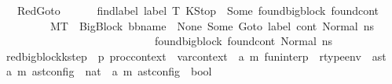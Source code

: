 \begin{isabellebody}
\isanewline
\ \ {\isacharbar}{\kern0pt}\ RedGoto{\isacharcolon}{\kern0pt}\ \isanewline
\ \ \ \ {\isachardoublequoteopen}{\isasymlbrakk}\ {\isacharparenleft}{\kern0pt}find{\isacharunderscore}{\kern0pt}label\ label\ T\ KStop{\isacharparenright}{\kern0pt}\ {\isacharequal}{\kern0pt}\ Some\ {\isacharparenleft}{\kern0pt}found{\isacharunderscore}{\kern0pt}bigblock{\isacharcomma}{\kern0pt}\ found{\isacharunderscore}{\kern0pt}cont{\isacharparenright}{\kern0pt}\ {\isasymrbrakk}\ \isanewline
\ \ \ \ \ \ \ \ {\isasymLongrightarrow}\ M{\isacharcomma}{\kern0pt}{\isasymLambda}{\isacharcomma}{\kern0pt}{\isasymGamma}{\isacharcomma}{\kern0pt}{\isasymOmega}{\isacharcomma}{\kern0pt}T\ {\isasymturnstile}\ {\isasymlangle}{\isacharparenleft}{\kern0pt}{\isacharparenleft}{\kern0pt}BigBlock\ bb{\isacharunderscore}{\kern0pt}name\ {\isacharbrackleft}{\kern0pt}{\isacharbrackright}{\kern0pt}\ None\ {\isacharparenleft}{\kern0pt}Some\ {\isacharparenleft}{\kern0pt}Goto\ label{\isacharparenright}{\kern0pt}{\isacharparenright}{\kern0pt}{\isacharparenright}{\kern0pt}{\isacharcomma}{\kern0pt}\ cont{}{\isacharcomma}{\kern0pt}\ Normal\ n{\isacharunderscore}{\kern0pt}s{\isacharparenright}{\kern0pt}{\isasymrangle}\ {\isasymlongrightarrow}\ \isanewline
\ \ \ \ \ \ \ \ \ \ \ \ \ \ \ \ \ \ \ \ \ \ \ \ \ \ \ \ {\isacharparenleft}{\kern0pt}found{\isacharunderscore}{\kern0pt}bigblock{\isacharcomma}{\kern0pt}\ found{\isacharunderscore}{\kern0pt}cont{\isacharcomma}{\kern0pt}\ {\isacharparenleft}{\kern0pt}Normal\ n{\isacharunderscore}{\kern0pt}s{\isacharparenright}{\kern0pt}{\isacharparenright}{\kern0pt}{\isachardoublequoteclose}\isanewline
\isanewline
{}\isamarkupfalse%
\ red{\isacharunderscore}{\kern0pt}bigblock{\isacharunderscore}{\kern0pt}k{\isacharunderscore}{\kern0pt}step\ {\isacharcolon}{\kern0pt}{\isacharcolon}{\kern0pt}\ {\isachardoublequoteopen}{\isacharprime}{\kern0pt}p\ proc{\isacharunderscore}{\kern0pt}context\ {\isasymRightarrow}\ var{\isacharunderscore}{\kern0pt}context\ {\isasymRightarrow}\ {\isacharparenleft}{\kern0pt}{\isacharprime}{\kern0pt}a{\isacharcomma}{\kern0pt}\ {\isacharprime}{\kern0pt}m{\isacharparenright}{\kern0pt}\ fun{\isacharunderscore}{\kern0pt}interp\ {\isasymRightarrow}\ rtype{\isacharunderscore}{\kern0pt}env\ {\isasymRightarrow}\ ast\ {\isasymRightarrow}\ {\isacharparenleft}{\kern0pt}{\isacharprime}{\kern0pt}a{\isacharcomma}{\kern0pt}\ {\isacharprime}{\kern0pt}m{\isacharparenright}{\kern0pt}\ ast{\isacharunderscore}{\kern0pt}config\ {\isasymRightarrow}\ nat\ {\isasymRightarrow}\ {\isacharparenleft}{\kern0pt}{\isacharprime}{\kern0pt}a{\isacharcomma}{\kern0pt}\ {\isacharprime}{\kern0pt}m{\isacharparenright}{\kern0pt}\ ast{\isacharunderscore}{\kern0pt}config\ {\isasymRightarrow}\ bool{\isachardoublequoteclose}\isanewline

\end{isabellebody}
